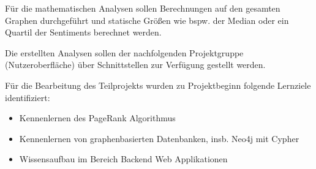 Für die mathematischen Analysen sollen Berechnungen auf den gesamten Graphen durchgeführt und statische Größen wie bspw. der Median oder ein Quartil der Sentiments berechnet werden.

Die erstellten Analysen sollen der nachfolgenden Projektgruppe (Nutzeroberfläche) über Schnittstellen zur Verfügung gestellt werden.

Für die Bearbeitung des Teilprojekts wurden zu Projektbeginn folgende Lernziele identifiziert:
\begin{itemize}
  \item Kennenlernen des PageRank Algorithmus
  \item Kennenlernen von graphenbasierten Datenbanken, insb. Neo4j mit Cypher
  \item Wissensaufbau im Bereich Backend Web Applikationen
\end{itemize}

